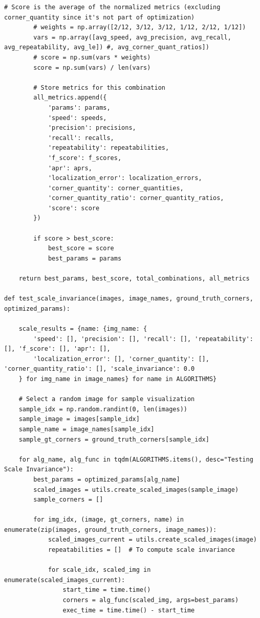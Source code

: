\documentclass[journal]{IEEEtran}
\begin{document}
\begin{lstlisting}[style=python, caption={Driver Script for Project}, label={lst:driver}]
        # Score is the average of the normalized metrics (excluding corner_quantity since it's not part of optimization)
        # weights = np.array([2/12, 3/12, 3/12, 1/12, 2/12, 1/12])
        vars = np.array([avg_speed, avg_precision, avg_recall, avg_repeatability, avg_le]) #, avg_corner_quant_ratios])
        # score = np.sum(vars * weights)
        score = np.sum(vars) / len(vars)
        
        # Store metrics for this combination
        all_metrics.append({
            'params': params,
            'speed': speeds,
            'precision': precisions,
            'recall': recalls,
            'repeatability': repeatabilities,
            'f_score': f_scores,
            'apr': aprs,
            'localization_error': localization_errors,
            'corner_quantity': corner_quantities,
            'corner_quantity_ratio': corner_quantity_ratios,
            'score': score
        })
        
        if score > best_score:
            best_score = score
            best_params = params
    
    return best_params, best_score, total_combinations, all_metrics

def test_scale_invariance(images, image_names, ground_truth_corners, optimized_params):

    scale_results = {name: {img_name: {
        'speed': [], 'precision': [], 'recall': [], 'repeatability': [], 'f_score': [], 'apr': [],
        'localization_error': [], 'corner_quantity': [], 'corner_quantity_ratio': [], 'scale_invariance': 0.0
    } for img_name in image_names} for name in ALGORITHMS}
        
    # Select a random image for sample visualization
    sample_idx = np.random.randint(0, len(images))
    sample_image = images[sample_idx]
    sample_name = image_names[sample_idx]
    sample_gt_corners = ground_truth_corners[sample_idx]
    
    for alg_name, alg_func in tqdm(ALGORITHMS.items(), desc="Testing Scale Invariance"):
        best_params = optimized_params[alg_name]
        scaled_images = utils.create_scaled_images(sample_image)
        sample_corners = []
        
        for img_idx, (image, gt_corners, name) in enumerate(zip(images, ground_truth_corners, image_names)):
            scaled_images_current = utils.create_scaled_images(image)
            repeatabilities = []  # To compute scale invariance
            
            for scale_idx, scaled_img in enumerate(scaled_images_current):
                start_time = time.time()
                corners = alg_func(scaled_img, args=best_params)
                exec_time = time.time() - start_time
                

\end{lstlisting}
\end{document}
